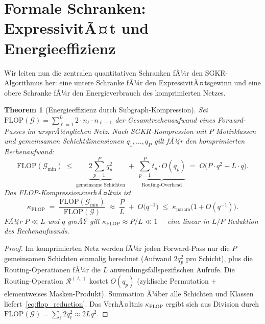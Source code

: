 ﻿\documentclass[12pt, a4paper, openany]{report}
\newtheorem{theorem}{Theorem}[chapter]
\newcommand{\calG}{\mathcal{G}}
\newcommand{\calR}{\mathcal{R}}
\begin{document}
\section{Formale Schranken: ExpressivitÃ¤t und Energieeffizienz}
\label{sec:sgkr_bounds}

Wir leiten nun die zentralen quantitativen Schranken fÃ¼r den
SGKR-Algorithmus her: eine untere Schranke fÃ¼r den ExpressivitÃ¤tsgewinn
und eine obere Schranke fÃ¼r den Energieverbrauch des komprimierten Netzes.

\begin{theorem}[Energieeffizienz durch Subgraph-Kompression]
\label{thm:energy_efficiency}
Sei $\mathrm{FLOP}(\calG) = \sum_{\ell=1}^L 2 \cdot n_\ell \cdot n_{\ell-1}$
der Gesamtrechenaufwand eines Forward-Passes im ursprÃ¼nglichen Netz.  Nach
SGKR-Kompression mit $P$ Motivklassen und gemeinsamen Schichtdimensionen
$q_1, \ldots, q_P$ gilt fÃ¼r den komprimierten Rechenaufwand:
\begin{equation}
  \label{eq:flop_reduction}
  \mathrm{FLOP}(\calG_{\min})
  \;\leq\;
  \underbrace{
    2\sum_{p=1}^{P} q_p^2
  }_{\text{gemeinsame Schichten}}
  \;+\;
  \underbrace{
    \sum_{p=1}^{P} t_p \cdot O(q_p)
  }_{\text{Routing-Overhead}}
  \;=\;
  O\!\bigl(P \cdot q^2 + L \cdot q\bigr).
\end{equation}
Das \emph{FLOP-KompressionsverhÃ¤ltnis} ist
\begin{equation}
  \label{eq:flop_ratio}
  \kappa_{\mathrm{FLOP}}
  \;=\;
  \frac{\mathrm{FLOP}(\calG_{\min})}{\mathrm{FLOP}(\calG)}
  \;\approx\;
  \frac{P}{L} \;+\; O\!\bigl(q^{-1}\bigr)
  \;\leq\; \kappa_{\mathrm{param}}\bigl(1 + O(q^{-1})\bigr).
\end{equation}
FÃ¼r $P \ll L$ und $q$ groÃŸ gilt $\kappa_{\mathrm{FLOP}} \approx P/L \ll 1$~--
eine linear-in-$L/P$ Reduktion des Rechenaufwands.
\end{theorem}

\begin{proof}
Im komprimierten Netz werden fÃ¼r jeden Forward-Pass nur die $P$ gemeinsamen
Schichten einmalig berechnet (Aufwand $2q_p^2$ pro Schicht), plus die
Routing-Operationen fÃ¼r die $L$ anwendungsfallspezifischen Aufrufe.
Die Routing-Operation $\calR^{(\ell_i)}$ kostet $O(q_p)$ (zyklische
Permutation + elementweises Masken-Produkt).  Summation Ã¼ber alle
Schichten und Klassen liefert~\eqref{eq:flop_reduction}.  Das VerhÃ¤ltnis
$\kappa_{\mathrm{FLOP}}$ ergibt sich aus Division durch
$\mathrm{FLOP}(\calG) = \sum_\ell 2 q_\ell^2 \approx 2Lq^2$.
\end{proof}
\end{document}
